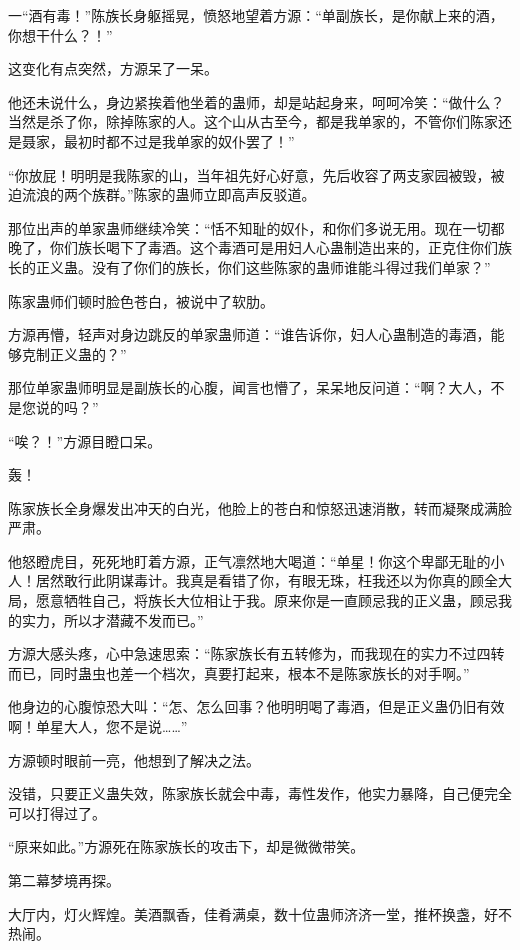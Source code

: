 
\begin{this_body}

一“酒有毒！”陈族长身躯摇晃，愤怒地望着方源：“单副族长，是你献上来的酒，你想干什么？！”

这变化有点突然，方源呆了一呆。

他还未说什么，身边紧挨着他坐着的蛊师，却是站起身来，呵呵冷笑：“做什么？当然是杀了你，除掉陈家的人。这个山从古至今，都是我单家的，不管你们陈家还是聂家，最初时都不过是我单家的奴仆罢了！”

“你放屁！明明是我陈家的山，当年祖先好心好意，先后收容了两支家园被毁，被迫流浪的两个族群。”陈家的蛊师立即高声反驳道。

那位出声的单家蛊师继续冷笑：“恬不知耻的奴仆，和你们多说无用。现在一切都晚了，你们族长喝下了毒酒。这个毒酒可是用妇人心蛊制造出来的，正克住你们族长的正义蛊。没有了你们的族长，你们这些陈家的蛊师谁能斗得过我们单家？”

陈家蛊师们顿时脸色苍白，被说中了软肋。

方源再懵，轻声对身边跳反的单家蛊师道：“谁告诉你，妇人心蛊制造的毒酒，能够克制正义蛊的？”

那位单家蛊师明显是副族长的心腹，闻言也懵了，呆呆地反问道：“啊？大人，不是您说的吗？”

“唉？！”方源目瞪口呆。

轰！

陈家族长全身爆发出冲天的白光，他脸上的苍白和惊怒迅速消散，转而凝聚成满脸严肃。

他怒瞪虎目，死死地盯着方源，正气凛然地大喝道：“单星！你这个卑鄙无耻的小人！居然敢行此阴谋毒计。我真是看错了你，有眼无珠，枉我还以为你真的顾全大局，愿意牺牲自己，将族长大位相让于我。原来你是一直顾忌我的正义蛊，顾忌我的实力，所以才潜藏不发而已。”

方源大感头疼，心中急速思索：“陈家族长有五转修为，而我现在的实力不过四转而已，同时蛊虫也差一个档次，真要打起来，根本不是陈家族长的对手啊。”

他身边的心腹惊恐大叫：“怎、怎么回事？他明明喝了毒酒，但是正义蛊仍旧有效啊！单星大人，您不是说……”

方源顿时眼前一亮，他想到了解决之法。

没错，只要正义蛊失效，陈家族长就会中毒，毒性发作，他实力暴降，自己便完全可以打得过了。

“原来如此。”方源死在陈家族长的攻击下，却是微微带笑。

第二幕梦境再探。

大厅内，灯火辉煌。美酒飘香，佳肴满桌，数十位蛊师济济一堂，推杯换盏，好不热闹。


\end{this_body}
